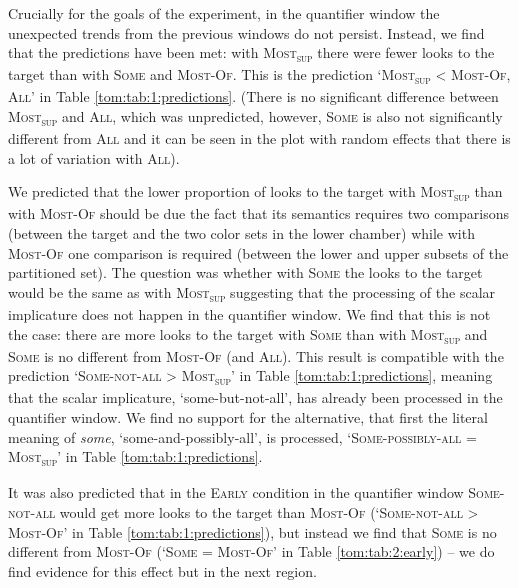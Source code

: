 \documentclass[output=paper]{langscibook}
\begin{document}
Crucially for the goals of the experiment, in the quantifier window the unexpected trends from the previous windows do
not persist. Instead, we find that the predictions have been met: with \textsc{Most\textsubscript{sup}} there were
fewer looks to the target than with \textsc{Some} and \textsc{Most-Of}. This is the prediction
`\textsc{Most\textsubscript{sup}} {\textless} \textsc{Most-Of}, \textsc{All}' in Table \ref{tom:tab:1:predictions}. (There is no significant
difference between \textsc{Most\textsubscript{sup}} and \textsc{All}, which was unpredicted, however, \textsc{Some} is
also not significantly different from \textsc{All} and it can be seen in the plot with random effects that there is a
lot of variation with \textsc{All}). 

We predicted that the lower proportion of looks to the target with \textsc{Most\textsubscript{sup}} than with
\textsc{Most-Of} should be due the fact that its semantics requires two comparisons (between the target and the two
color sets in the lower chamber) while with \textsc{Most-Of} one comparison is required (between the lower and upper
subsets of the partitioned set). The question was whether with \textsc{Some} the looks to the target would be the same
as with \textsc{Most\textsubscript{sup}} suggesting that the processing of the scalar implicature does not happen in
the quantifier window. We find that this is not the case: there are more looks to the target with \textsc{Some} than
with \textsc{Most\textsubscript{sup}} and \textsc{Some} is no different from \textsc{Most-Of} (and \textsc{All}). This
result is compatible with the prediction `\textsc{Some-not-all} {\textgreater} \textsc{Most\textsubscript{sup}}' in
Table \ref{tom:tab:1:predictions}, meaning that the scalar implicature, `some-but-not-all', has already been processed in the quantifier
window. We find no support for the alternative, that first the literal meaning of \textit{some}, `some-and-possibly-all', is processed, `\textsc{Some-possibly-all} = \textsc{Most\textsubscript{sup}}' in Table \ref{tom:tab:1:predictions}.

It was also predicted that in the \textsc{Early} condition in the quantifier window \textsc{Some-not-all} would get more looks to
the target than \textsc{Most-Of} (`\textsc{Some-not-all} {\textgreater} \textsc{Most-Of}' in Table \ref{tom:tab:1:predictions}), but instead we
find that \textsc{Some} is no different from \textsc{Most-Of} (`\textsc{Some} = \textsc{Most-Of}' in Table \ref{tom:tab:2:early}) – we do
find evidence for this effect but in the next region.
\end{document}
